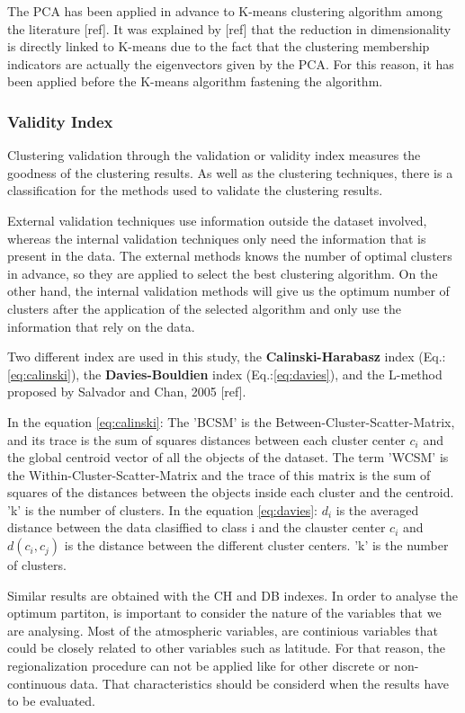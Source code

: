 The PCA has been applied in advance to K-means clustering algorithm among the literature [ref]. It was explained by [ref] that the reduction in dimensionality is directly linked to K-means due to the fact that the clustering membership indicators are actually the eigenvectors given by the PCA. For this reason, it has been applied before the K-means algorithm fastening the algorithm.

\subsubsection{Validity Index}

Clustering validation through the validation or validity index measures the goodness of the clustering results. As well as the clustering techniques, there is a classification for the methods used to validate the clustering results.

External validation techniques use information outside the dataset involved, whereas the internal validation techniques only need the information that is present in the data. The external methods knows the number of optimal clusters in advance, so they are applied to select the best clustering algorithm. On the other hand, the internal validation methods will give us the optimum number of clusters after the application of the selected algorithm and only use the information that rely on the data.

Two different index are used in this study, the \textbf{Calinski-Harabasz} index (Eq.:\ref{eq:calinski}), the \textbf{Davies-Bouldien} index (Eq.:\ref{eq:davies}), and the L-method proposed by Salvador and Chan, 2005 [ref].

In the equation \ref{eq:calinski}: The 'BCSM' is the Between-Cluster-Scatter-Matrix, and its trace is the sum of squares distances between each cluster center $c_{i}$ and the global centroid vector of all the objects of the dataset. The term 'WCSM' is the Within-Cluster-Scatter-Matrix and the trace of this matrix is the sum of squares of the distances between the objects inside each cluster and the centroid. 'k' is the number of clusters. In the equation \ref{eq:davies}: $d_{i}$ is the averaged distance between the data clasiffied to class i and the clauster center $c_{i}$ and $d(c_i,c_j)$ is the distance between the different cluster centers. 'k' is the number of clusters. 

Similar results are obtained with the CH and DB indexes. In order to analyse the optimum partiton, is important to consider the nature of the variables that we are analysing. Most of the atmospheric variables, are continious variables that could be closely related to other variables such as latitude. For that reason, the regionalization procedure can not be applied like for other discrete or non-continuous data. That characteristics should be considerd when the results have to be evaluated.

